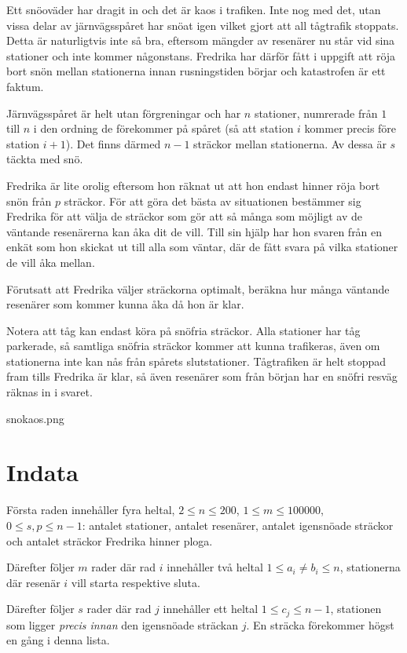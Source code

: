 Ett snöoväder har dragit in och det är kaos i trafiken.
Inte nog med det, utan vissa delar av järnvägsspåret har snöat igen vilket gjort att all tågtrafik stoppats.
Detta är naturligtvis inte så bra, eftersom mängder av resenärer nu står vid sina stationer och inte kommer någonstans.
Fredrika har därför fått i uppgift att röja bort snön mellan stationerna innan rusningstiden börjar och katastrofen är ett faktum.

Järnvägsspåret är helt utan förgreningar och har $n$ stationer, numrerade från $1$ till $n$ i den ordning de förekommer på spåret (så att station $i$ kommer precis före station $i+1$).
Det finns därmed $n - 1$ sträckor mellan stationerna.
Av dessa är $s$ täckta med snö.

Fredrika är lite orolig eftersom hon räknat ut att hon endast hinner röja bort snön från $p$ sträckor.
För att göra det bästa av situationen bestämmer sig Fredrika för att välja de sträckor som gör att så många som möjligt av de väntande resenärerna kan åka dit de vill.
Till sin hjälp har hon svaren från en enkät som hon skickat ut till alla som väntar, där de fått svara på vilka stationer de vill åka mellan.

Förutsatt att Fredrika väljer sträckorna optimalt, beräkna hur många väntande resenärer som kommer kunna åka då hon är klar.

Notera att tåg kan endast köra på snöfria sträckor. Alla stationer har tåg parkerade, så samtliga snöfria sträckor kommer att kunna trafikeras, även om stationerna inte kan nås från spårets slutstationer. Tågtrafiken är helt stoppad fram tills Fredrika är klar, så även resenärer som från början har en snöfri resväg räknas in i svaret.

snokaos.png

\section*{Indata}
Första raden innehåller fyra heltal, $2 \le n \le 200$, $ 1 \le m \le 100000 $, $ 0 \le s, p \le n - 1$: antalet stationer, antalet resenärer, antalet igensnöade sträckor och antalet sträckor Fredrika hinner ploga.

Därefter följer $m$ rader där rad $i$ innehåller två heltal $1 \le a_i \not= b_i \le n$, stationerna där resenär $i$ vill starta respektive sluta.

Därefter följer $s$ rader där rad $j$ innehåller ett heltal $ 1 \le c_j \le n - 1$, stationen som ligger \emph{precis innan} den igensnöade sträckan $j$.
En sträcka förekommer högst en gång i denna lista.


